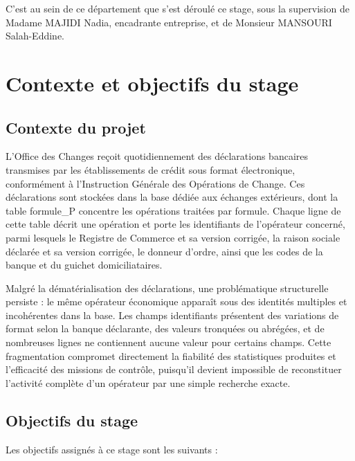 C'est au sein de ce département que s'est déroulé ce stage, sous la supervision de Madame MAJIDI Nadia, encadrante entreprise, et de Monsieur MANSOURI Salah-Eddine.

\section{Contexte et objectifs du stage}

\subsection{Contexte du projet}

L'Office des Changes reçoit quotidiennement des déclarations bancaires transmises par les établissements de crédit sous format électronique, conformément à l'Instruction Générale des Opérations de Change. Ces déclarations sont stockées dans la base dédiée aux échanges extérieurs, dont la table formule\_P concentre les opérations traitées par formule. Chaque ligne de cette table décrit une opération et porte les identifiants de l'opérateur concerné, parmi lesquels le Registre de Commerce et sa version corrigée, la raison sociale déclarée et sa version corrigée, le donneur d'ordre, ainsi que les codes de la banque et du guichet domiciliataires.

Malgré la dématérialisation des déclarations, une problématique structurelle persiste : le même opérateur économique apparaît sous des identités multiples et incohérentes dans la base. Les champs identifiants présentent des variations de format selon la banque déclarante, des valeurs tronquées ou abrégées, et de nombreuses lignes ne contiennent aucune valeur pour certains champs. Cette fragmentation compromet directement la fiabilité des statistiques produites et l'efficacité des missions de contrôle, puisqu'il devient impossible de reconstituer l'activité complète d'un opérateur par une simple recherche exacte.

\subsection{Objectifs du stage}

Les objectifs assignés à ce stage sont les suivants :

